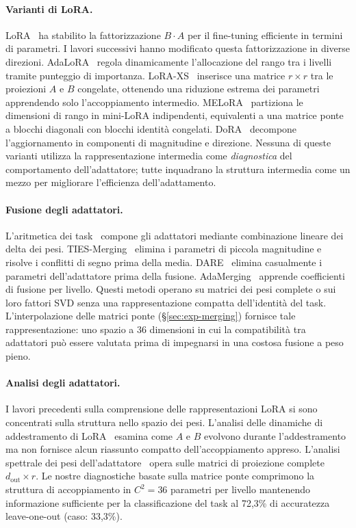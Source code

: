 \documentclass[11pt]{article}
\begin{document}
\paragraph{Varianti di LoRA.}
LoRA~\cite{hu2022lora} ha stabilito la fattorizzazione $B \cdot A$ per
il fine-tuning efficiente in termini di parametri. I lavori successivi
hanno modificato questa fattorizzazione in diverse direzioni.
AdaLoRA~\cite{zhang2023adalora} regola dinamicamente l'allocazione del
rango tra i livelli tramite punteggio di importanza.
LoRA-XS~\cite{banaei2024loraxs} inserisce una matrice $r \times r$ tra
le proiezioni $A$ e $B$ congelate, ottenendo una riduzione estrema dei
parametri apprendendo solo l'accoppiamento intermedio.
MELoRA~\cite{ren2024melora} partiziona le dimensioni di rango in
mini-LoRA indipendenti, equivalenti a una matrice ponte a blocchi
diagonali con blocchi identit\`a congelati.
DoRA~\cite{liu2024dora} decompone l'aggiornamento in componenti di
magnitudine e direzione. Nessuna di queste varianti utilizza la
rappresentazione intermedia come \emph{diagnostica} del comportamento
dell'adattatore; tutte inquadrano la struttura intermedia come un mezzo
per migliorare l'efficienza dell'adattamento.

\paragraph{Fusione degli adattatori.}
L'aritmetica dei task~\cite{ilharco2023editing} compone gli adattatori
mediante combinazione lineare dei delta dei pesi.
TIES-Merging~\cite{yadav2023ties} elimina i parametri di piccola
magnitudine e risolve i conflitti di segno prima della media.
DARE~\cite{yu2024dare} elimina casualmente i parametri dell'adattatore
prima della fusione. AdaMerging~\cite{yang2024adamerging} apprende
coefficienti di fusione per livello. Questi metodi operano su matrici
dei pesi complete o sui loro fattori SVD senza una rappresentazione
compatta dell'identit\`a del task.
L'interpolazione delle matrici ponte (\S\ref{sec:exp-merging}) fornisce
tale rappresentazione: uno spazio a 36 dimensioni in cui la
compatibilit\`a tra adattatori pu\`o essere valutata prima di
impegnarsi in una costosa fusione a peso pieno.

\paragraph{Analisi degli adattatori.}
I lavori precedenti sulla comprensione delle rappresentazioni LoRA si
sono concentrati sulla struttura nello spazio dei pesi. L'analisi delle
dinamiche di addestramento di LoRA~\cite{biderman2024lora} esamina come
$A$ e $B$ evolvono durante l'addestramento ma non fornisce alcun
riassunto compatto dell'accoppiamento appreso. L'analisi spettrale dei
pesi dell'adattatore~\cite{zhang2023adalora} opera sulle matrici di
proiezione complete $d_\text{out} \times r$.
Le nostre diagnostiche basate sulla matrice ponte comprimono la
struttura di accoppiamento in $C^2 = 36$ parametri per livello
mantenendo informazione sufficiente per la classificazione del task
al 72,3\% di accuratezza leave-one-out (caso: 33,3\%).
\end{document}
